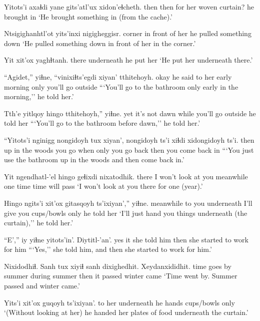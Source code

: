 \documentclass[12pt]{article}
\begin{document}
\gll Yitots'i axaɬdi yane  gits'atl'ux xidon'eɬcheth. 
then     then   {for her} {woven curtain?} {he brought in}
\glt `He brought something in (from the cache).'
\glend

\gll Ntsigighanhtl'ot yits'inxi       nigigheggisr.              
corner           {in front of her} {he pulled something down}
\glt `He pulled something down in front of her in the corner.'
\glend

\gll Yit   xit'ox     yaghɬtanh.
there underneath {he put her}
\glt `He put her underneath there.'
\glend

\gll ``Agidet,'' yiɬne, ``vinixiɬts'egdi xiyan' tthitehoyh.
okay   {he said to her} {early morning}  only  {you'll go outside}
\glt ```You'll go to the bathroom only early in the morning,'' he told her.'
\glend

\gll Tth'e yitlqoy       hingo tthitehoyh,''        yiɬne.
yet   {it's not dawn} while {you'll go outside} {he told her}
\glt ```You'll go to the bathroom before dawn,'' he told her.'
\glend

\gll ``Yitots'i nginigg         nongidoyh tux xiyan',  nongidoyh ts'i xiɬdi xidongidoyh      ts'i.
then     {up in the woods} {you go} when only  {you go back} {} then  {you come back in}
\glt ```You just use the bathroom up in the woods and then come back in.'
\glend

\gll Yit   ngendhatl-'el       hingo     geɬixdi nixatodhik.
there {I won't look at you} meanwhile {one time}  {time will pass}
\glt `I won't look at you there for one (year).'
\glend

\gll Hingo     ngits'i xit'ox     gitasqoyh            ts'ixiyan','' yiɬne.
meanwhile {to you}  underneath {I'll give you cups/bowls} only      {he told her}
\glt `I'll just hand you things underneath (the curtain),'' he told her.'
\glend

\gll ``E',''  iy yiɬne       yitots'in'. Diytitl-'an'.              
yes  it {she told him} then        {she started to work for him}
\glt ```Yes,'' she told him, and then she started to work for him.'
\glend

\gll Nixidodhiɬ.  Sanh tux  xiyiɬ    sanh   dixighedhit. Xeydanxididhit.
{time goes by} summer during summer then  {it passed}     {winter came}
\glt `Time went by. Summer passed and winter came.'
\glend

\gll Yits'i xit'ox     guqoyh                        ts'ixiyan'.
{to her} underneath {he hands cups/bowls} only
\glt `(Without looking at her) he handed her plates of food underneath the curtain.'
\glend
\end{document}

